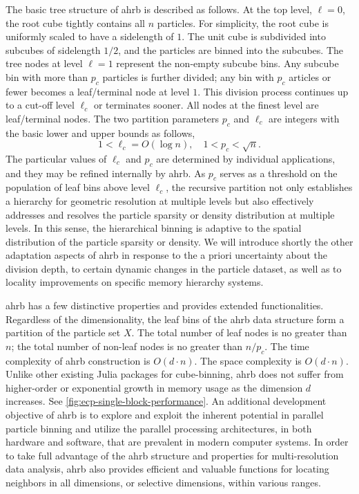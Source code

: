 \documentclass[final]{juliacon}
\begin{document}
The basic tree structure of {\sc ahrb} is described as follows. At the top
level, $\ell=0$, the root cube tightly contains all $n$ particles. For
simplicity, the root cube is uniformly scaled to have a sidelength of $1$. The
unit cube is subdivided into subcubes of sidelength $1/2$, and the particles
are binned into the subcubes. The tree nodes at level $\ell=1$ represent the
non-empty subcube bins. Any subcube bin with more than $p_{c}$ particles is
further divided; any bin with $p_{c}$ articles or fewer becomes a leaf/terminal
node at level $1$. This division process continues up to a cut-off level
$\ell_c$ or terminates sooner. All nodes at the finest level are leaf/terminal
nodes. The two partition parameters $p_{c}$ and $\ell_{c}$ are integers with the
basic lower and upper bounds as follows,
%
\begin{equation}
  \label{eq:ellc-pc-bounds}
  1 < \ell_{c} = O(\log n),
  \quad
  1 < p_{c} < \sqrt{n}.
\end{equation}
%
The particular values of $\ell_{c}$ and $p_{c}$ are determined by
individual applications, and they may be refined internally by {\sc
  ahrb}.  As $p_{c}$ serves as a threshold on the population of leaf
bins above level $\ell_c$, the recursive partition not only
establishes a hierarchy for geometric resolution at multiple levels
but also effectively addresses and resolves the particle sparsity or
density distribution at multiple levels. In this sense, the
hierarchical binning is adaptive to the spatial distribution of the
particle sparsity or density. We will introduce shortly the other
adaptation aspects of {\sc ahrb} in response to the a priori
uncertainty about the division depth, to certain dynamic changes in
the particle dataset, as well as to locality improvements on specific
memory hierarchy systems.



%

{\sc ahrb} has a few distinctive properties and provides extended
functionalities.  Regardless of the dimensionality, the leaf bins of
the {\sc ahrb} data structure form a partition of the particle set
$X$.  The total number of leaf nodes is no greater than $n$; the total
number of non-leaf nodes is no greater than $n/p_c$. The time
complexity of {\sc ahrb} construction is $O(d \cdot n)$. The space complexity
is $O(d\cdot n)$.
%
Unlike other existing Julia packages for cube-binning, {\sc ahrb} does
not suffer from higher-order or exponential growth in memory usage as
the dimension $d$ increases. See \cref{fig:ecp-single-block-performance}.
%
An additional development objective of {\sc ahrb} is to explore and exploit the
inherent potential in parallel particle binning and utilize the parallel
processing architectures, in both hardware and software, that are prevalent in
modern computer systems.
%
In order to take full advantage of the {\sc ahrb} structure and properties for
multi-resolution data analysis, {\sc ahrb} also provides efficient and valuable
functions for locating neighbors in all dimensions, or selective dimensions,
within various ranges.
\end{document}
